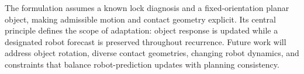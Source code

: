\documentclass[conference]{IEEEtran}
\begin{document}
The formulation assumes a known lock diagnosis and a fixed-orientation planar object, making admissible motion and contact geometry explicit. Its central principle defines the scope of adaptation: object response is updated while a designated robot forecast is preserved throughout recurrence. Future work will address object rotation, diverse contact geometries, changing robot dynamics, and constraints that balance robot-prediction updates with planning consistency.



\end{document}
